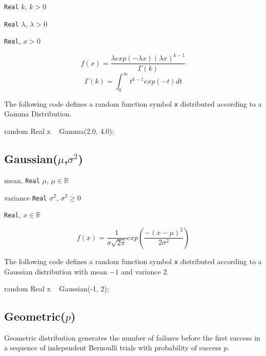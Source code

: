 \begin{itemize*}
\item[] \verb|Real| $k$, $k > 0$
\item[] \verb|Real| $\lambda$, $\lambda > 0$ 
\end{itemize*}

\begin{itemize*}
\item[] \verb|Real|, $x > 0$
\end{itemize*}

\[
	f(x) = \frac{\lambda exp(-\lambda x) (\lambda x)^{k-1}}{\Gamma(k)}
\]
\[
	\Gamma(k) = \int_{0}^{\infty} t^{k-1}exp(-t) dt
\]

The following code defines a random function symbol \verb|x| distributed according to a Gamma Distribution.
\begin{blogcode}
random Real x ~ Gamma(2.0, 4.0);
\end{blogcode}

\subsection{Gaussian($\mu$,$\sigma^2$)}

\begin{itemize*}
\item[] mean, \verb|Real|
 $\mu$, $\mu \in \mathbb{R}$
\item[] variance \verb|Real|
 $\sigma^2$, $\sigma^2 \geq 0$ 
\end{itemize*}

\begin{itemize*}
\item[] \verb|Real|, $x \in \mathbb{R}$ 
\end{itemize*}

\[
	f(x) = \frac{1}{\sigma \sqrt{2 \pi}} exp(\frac{-(x-\mu)^{2}}{2 \sigma^{2}})
\]

The following code defines a random function symbol \verb|x| distributed according to a Gaussian distribution with mean $-1$ and variance $2$.
\begin{blogcode}
random Real x ~ Gaussian(-1, 2);
\end{blogcode}

\subsection{Geometric($p$)}
Geometric distribution generates the number of failures before the first success in a sequence of independent Bernoulli trials with probability of success $p$.

